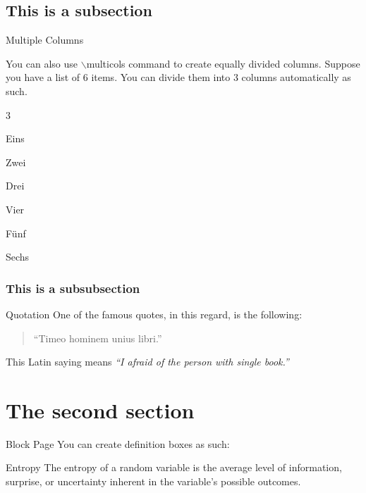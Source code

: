 \documentclass[aspectratio=43]{beamer}
\begin{document}
\subsection{This is a subsection}

\begin{frame}[t]{Multiple Columns}

\justify
    You can also use $\backslash$multicols command to create equally divided columns. Suppose you have a list of 6 items. You can divide them into 3 columns automatically as such.
    \vspace{1cm}
    \begin{enumerate}
    \begin{multicols}{3}
        \item Eins
        \item Zwei
        \item Drei
        \item Vier
        \item Fünf
        \item Sechs
    \end{multicols}    
    \end{enumerate}
    
\end{frame}

\subsubsection{This is a subsubsection}

\begin{frame}[t]{Quotation}
One of the famous quotes, in this regard, is the following:

    \begin{quote}
        ``Timeo hominem unius libri.''
    \end{quote}
    
    This Latin saying means \textit{``I afraid of the person with single book.''}
\end{frame}

\section{The second section}

\begin{frame}[t]{Block Page}
You can create definition boxes as such:
    \begin{block}{Entropy}
    \justify
     The \textcolor{metured}{entropy} of a random variable is the average level of information, surprise, or \textcolor{metured}{uncertainty} inherent in the variable's possible outcomes.
    \end{block}
\end{frame}
\end{document}
